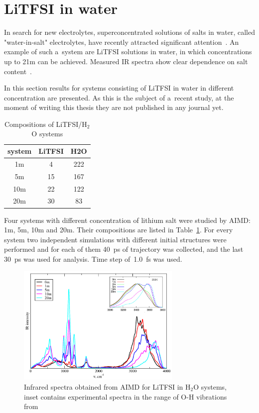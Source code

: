 \section{LiTFSI in water}

In search for new electrolytes, superconcentrated solutions of salts in water, called "water-in-salt" electrolytes, have recently attracted significant attention~\cite{li-tfsi-h2o-2,li-tfsi-h2o-3,li-tfsi-h2o-4,li-tfsi-h2o-5,li-tfsi-h2o-6,li-tfsi-h2o-7}. An example of such a~system are LiTFSI solutions in water, in which concentrations up to 21m can be achieved. Measured IR spectra show clear dependence on salt content~\cite{li-tfsi-h2o-1}.

In this section results for systems consisting of LiTFSI in water in different concentration are presented. As this is the subject of a~recent study, at the moment of writing this thesis they are not published in any journal yet.

\begin{table}[ht]
  \centering
  \caption{Compositions of LiTFSI/H$_2$O systems}
  \label{tab:li-tfsi-h2o-compositions}
\begin{tabular}{ccc}
\toprule
system & LiTFSI & H2O \\
\midrule
1m     & 4      & 222 \\
5m     & 15     & 167 \\
10m    & 22     & 122 \\
20m    & 30     & 83  \\
\bottomrule
\end{tabular}
\end{table}

Four systems with different concentration of lithium salt were studied by AIMD: 1m, 5m, 10m and 20m. Their compositions are listed in Table~\ref{tab:li-tfsi-h2o-compositions}. For every system two independent simulations with different initial structures were performed and for each of them 40~ps of trajectory was collected, and the last 30~ps was used for analysis. Time step of~1.0~fs was used.

\begin{figure}[ht]
    \centering
    \includegraphics[width=0.7\textwidth]{img/4-ir-spectra-from-aimd-simulations/5-li-tfsi-h2o/averages-with-water.png}
    \caption{Infrared spectra obtained from AIMD for LiTFSI in H$_2$O systems, inset contains experimental spectra in the range of O-H vibrations from~\cite{li-tfsi-h2o-1}}
    \label{fig:li-tfsi-h2o-ir-averages}
\end{figure}

